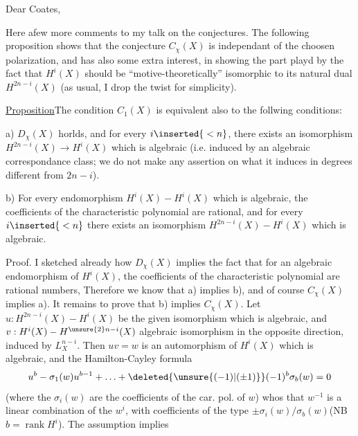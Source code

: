 

Dear Coates,

Here a\inserted{\ }few more comments to my talk on the conjectures. The following proposition shows that the conjecture $C_{\chi}(X)$ is independant of the choosen polarization, and has also some extra interest, in showing the part playd by the fact that $H^i(X)$ should be ``motive-theoretically'' isomorphic to its natural dual $H^{2n-i}(X)$ (as usual, I drop the twist for simplicity).

\uline{Proposition}\quad The condition $C_{1}(X)$ is equivalent also to  the follwing conditions:

a) $D_{\chi}(X)$ horlds, and for every $i\inserted{{}<n}$, there exists an isomorphism $H^{2n-i}(X)\to H^i(X)$ which is algebraic (i.e. induced by an algebraic correspondance class; we do not make any assertion on what it induces in degrees different from $2n-i$).

b) For every endomorphism $H^i(X)\mathbin{-}H^i(X)$ which is algebraic, the coefficients of the characteristic polynomial are rational, and for every $i\inserted{{}<n}$ there exists an isomorphism $H^{2n-i}(X)\mathbin{-}H^i(X)$ which is algebraic.

Proof. I sketched already how $D_{\chi}(X)$ implies the fact that for an algebraic endomorphism of $H^i(X)$, the coefficients of the characteristic polynomial are rational numbers, Therefore we know that a) implies b), and of course $C_{\chi}(X)$ implies a). It remains to prove that b) implies $C_{\chi}(X)$. Let $u:H^{2n-i}(X)\mathbin{-}H^i(X)$ be the given isomorphism which is algebraic, and $v:H^i(X)\mathbin{-}H^{\unsure{2}n-i}(X)$  algebraic isomorphism in the opposite direction, induced by $L_X^{n-i}$. Then $uv=w$ is an automorphism of $H^i(X)$ which is algebraic, and the Hamilton-Cayley formula
\[
u^{b}-\sigma_1(w)u^{b-1}+\ldots+\deleted{\unsure{(-1)|(\pm1)}}(-1)^b\sigma_b(w)=0
\]
(where the $\sigma_i(w)$ are the coefficients of the car. pol. of $w$) whos that $w^{-1}$ is a linear combination of the $w^i$, with coefficients of the type $\pm\sigma_i(w)/\sigma_b(w)$\quad (NB $b=\operatorname{rank}H^i$). The assumption implies

